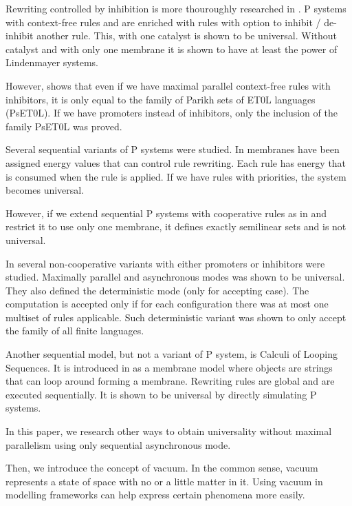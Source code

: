 \documentclass[a4paper,10pt]{article}
\begin{document}
Rewriting controlled by inhibition is more thouroughly researched in \cite{Cavaliere:2004:IRP:2144633.2144648}. P systems with context-free rules and are enriched with rules with option to inhibit / de-inhibit another rule. This, with one catalyst is shown to be universal. Without catalyst and with only one membrane it is shown to have at least the power of Lindenmayer systems.

However, \cite{doi:10.1142/S0129054106003772} shows that even if we have maximal parallel context-free rules with inhibitors, it is only equal to the family of Parikh sets of ET0L languages (PsET0L). If we have promoters instead of inhibitors, only the inclusion of the family PsET0L was proved. %

Several sequential variants of P systems were studied. In \cite{Freund:2004:SPS:2149813.2149831} membranes have been assigned energy values that can control rule rewriting. Each rule has energy that is consumed when the rule is applied. If we have rules with priorities, the system becomes universal.

However, if we extend sequential P systems with cooperative rules as in \cite{Dang04onp} and restrict it to use only one membrane, it defines exactly semilinear sets and is not universal.

In \cite{Alhazov13} several non-cooperative variants with either promoters or inhibitors were studied. Maximally parallel and asynchronous modes was shown to be universal. They also defined the deterministic mode (only for accepting case). The computation is accepted only if for each configuration there was at most one multiset of rules applicable. Such deterministic variant was shown to only accept the family of all finite languages.

Another sequential model, but not a variant of P system, is Calculi of Looping Sequences. It is introduced in \cite{Barbuti07thecalculus} as a membrane model where objects are strings that can loop around forming a membrane. Rewriting rules are global and are executed sequentially. It is shown to be universal by directly simulating P systems.


In this paper, we research other ways to obtain universality without maximal parallelism using only sequential asynchronous mode.

Then, we introduce the concept of vacuum. In the common sense, vacuum represents a state of space with no or a little matter in it. Using vacuum in modelling frameworks can help express certain phenomena more easily.
\end{document}
